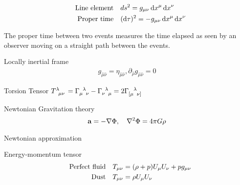 \documentclass[main]{subfiles}
\begin{document}
\begin{center}

\end{center}
\begin{multicols}{2}

\begin{align}
    \qq{Line element} & ds^2 = g_{\mu\nu}\dd{x}^\mu\dd{x}^\nu
    \\
    \qq{Proper time} & (\dd{\tau})^2 = -g_{\mu\nu}\dd{x}^\mu\dd{x}^\nu
\end{align}

The proper time between two events measures the time elapsed as seen by an observer moving on a straight path between the events. 

Locally inertial frame
\begin{align}
    g_{\hat{\mu}\hat{\nu}} = \eta_{\hat{\mu}\hat{\nu}}, \partial_{\hat{\rho}} g_{\hat{\mu}\hat{\nu}} = 0
\end{align}

Torsion Tensor $T\indices{^\lambda_\mu_\nu} = 
\Gamma\indices{_\mu^\lambda_\nu} - 
\Gamma\indices{_\nu^\lambda_\mu} =
2\Gamma\indices{_{[\mu}^\lambda_{\nu]}}$

Newtonian Gravitation theory
\begin{align}
    \vb{a} = -\nabla \Phi ,\quad \nabla^2\Phi = 4\pi G\rho
\end{align}

Newtonian approximation


Energy-momentum tensor
\begin{align}
    \qq{Perfect fluid} & T_{\mu\nu} = (\rho + p)U_\mu U_\nu + p g_{\mu \nu}\\
    \qq{Dust} & T_{\mu\nu} = \rho U_\mu U_\nu
\end{align}

\end{multicols}
\end{document}
